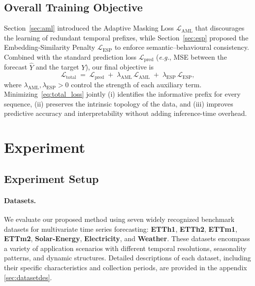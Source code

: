 \documentclass{article}
\begin{document}
\subsection{Overall Training Objective}
\label{sec:total_loss}
Section~\ref{sec:aml} introduced the Adaptive Masking Loss $\mathcal{L}_{\mathrm{AML}}$ that discourages the learning of redundant temporal prefixes, while Section~\ref{sec:esp} proposed the Embedding-Similarity Penalty $\mathcal{L}_{\mathrm{ESP}}$ to enforce semantic–behavioural consistency. Combined with the standard prediction loss $\mathcal{L}_{\mathrm{pred}}$ (\emph{e.g.}, MSE between the forecast $\hat{Y}$ and the target $Y$), our final objective is
\begin{equation}
\mathcal{L}_{\text{total}}
   \;=\;
   \mathcal{L}_{\mathrm{pred}}
   \;+\;
   \lambda_{\mathrm{AML}}\,
   \mathcal{L}_{\mathrm{AML}}
   \;+\;
   \lambda_{\mathrm{ESP}}\,
   \mathcal{L}_{\mathrm{ESP}},
\label{eq:total_loss}
\end{equation}
where $\lambda_{\mathrm{AML}},\lambda_{\mathrm{ESP}}\!>\!0$
control the strength of each auxiliary term.
Minimizing~\eqref{eq:total_loss} jointly
(i) identifies the informative prefix for every sequence,
(ii) preserves the intrinsic topology of the data,
and (iii) improves predictive accuracy and interpretability
without adding inference-time overhead.

\section{Experiment}
\subsection{Experiment Setup}

\paragraph{Datasets.} We evaluate our proposed method using seven widely recognized benchmark datasets for multivariate time series forecasting: \textbf{ETTh1}, \textbf{ETTh2}, \textbf{ETTm1}, \textbf{ETTm2}, \textbf{Solar-Energy}, \textbf{Electricity}, and \textbf{Weather}. These datasets encompass a variety of application scenarios with different temporal resolutions, seasonality patterns, and dynamic structures. Detailed descriptions of each dataset, including their specific characteristics and collection periods, are provided in the appendix \ref{sec:datasetdes}.
\end{document}
